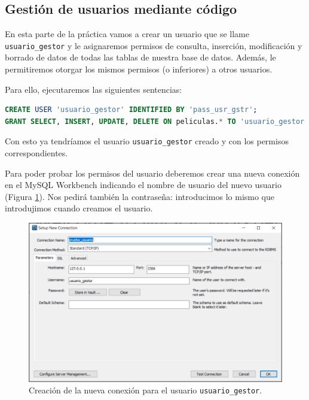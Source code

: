 \documentclass[a4paper]{article}
\begin{document}
\subsection*{Gestión de usuarios mediante código}

En esta parte de la práctica vamos a crear un usuario que se llame \texttt{usuario\_gestor} y le asignaremos permisos de consulta, inserción, modificación y borrado de datos de todas las tablas de nuestra base de datos. Además, le permitiremos otorgar los mismos permisos (o inferiores) a otros usuarios.

Para ello, ejecutaremos las siguientes sentencias:

\begin{lstlisting}[language=SQL]
CREATE USER 'usuario_gestor' IDENTIFIED BY 'pass_usr_gstr';
GRANT SELECT, INSERT, UPDATE, DELETE ON peliculas.* TO 'usuario_gestor';
\end{lstlisting}

Con esto ya tendríamos el usuario \texttt{usuario\_gestor} creado y con los permisos correspondientes.

Para poder probar los permisos del usuario deberemos crear una nueva conexión en el MySQL Workbench indicando el nombre de usuario del nuevo usuario (Figura \ref{fig:nueva-conexion}). Nos pedirá también la contraseña: introducimos lo mismo que introdujimos cuando creamos el usuario.

\begin{figure}[H]
    \centering
    \includegraphics[width=\textwidth]{figs/gestion-usuarios/nueva_conexion_usr.PNG}
    \caption{Creación de la nueva conexión para el usuario \texttt{usuario\_gestor}.}
    \label{fig:nueva-conexion}
\end{figure}
\end{document}
